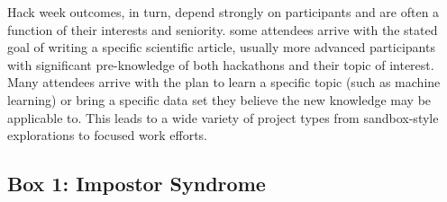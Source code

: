 Hack week outcomes, in turn, depend strongly on participants and are often a function of their interests and seniority.
some attendees arrive with the stated goal of writing a specific scientific article, usually more advanced participants with significant pre-knowledge of both hackathons and their topic of interest.
Many attendees arrive with the plan to learn a specific topic (such as machine learning) or bring a specific data set they believe the new knowledge may be applicable to.
This leads to a wide variety of project types from sandbox-style explorations to focused work efforts.

\subsection*{Box 1: Impostor Syndrome}

